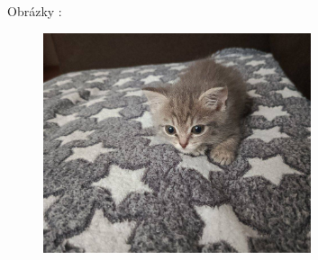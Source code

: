 \documentclass[]{article}
\begin{document}
Obrázky :

\begin{figure}[H]
\centering
\includegraphics[width=0.7\textwidth]{foto/ScreenshotIllegallySmolCats.png}
\caption{\label{fig:cato} \cite{cato}}
\end{figure}
\end{document}
